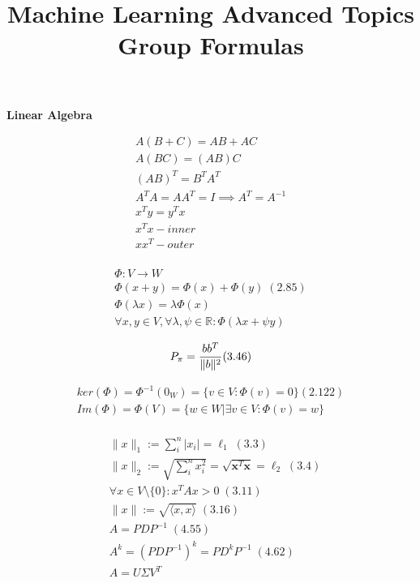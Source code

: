 \documentclass[fleqn,9pt]{article}
\date{} %
\title{Machine Learning Advanced Topics Group Formulas \vspace{-6em}}
\begin{document}
\maketitle



\begin{minipage}[t]{0.33\textwidth}

\textbf{Linear Algebra}

\begin{equation*}
\begin{split}
	A(B+C) = AB + AC\\
	A(BC) = (AB)C \\
	(AB)^T =B^TA^T\\
	A^TA = AA^T = I \implies A^T = A^{-1}\\
	x^Ty = y^Tx\\
		x^Tx - inner\\
	xx^T - outer\\
\end{split}	
\end{equation*}

\begin{multline*}
\Phi: V \to W \\
\Phi(x+y) = \Phi(x) + \Phi(y)\; (2.85) \\
	\Phi(\lambda x) =  \lambda \Phi(x)\\
\forall x,y\in V, \forall \lambda, \psi \in \mathbb{R} : \Phi(\lambda x + \psi y) 
\end{multline*}

\begin{equation*}
P_\pi=\frac{bb^T}{\|b\|^2} (3.46) \\
\end{equation*}

\begin{multline*}
ker(\Phi) = \Phi^{-1}(0_W) 
 = \{v\in V: \Phi(v) =0\} (2.122)\\
Im(\Phi) = \Phi(V) 
 =  \{w \in W | \exists v\in V: \Phi(v) = w \}\\
\end{multline*}

\begin{equation*}
\begin{split}
&\|x\|_1 := \sum_i^n |x_i| =\ell_1 \;(3.3)\\
&\|x\|_2 := \sqrt{\sum_i^n x_i^2} = \sqrt{\textbf{x}^T \textbf{x}} =\ell_2 \;(3.4)\\
&\forall x \in V\setminus\{0\}: x^TAx > 0\;(3.11)\\
&\|x\| := \sqrt{\langle x,x\rangle}\;(3.16)\\
&A = P D P^{-1}\;(4.55)\\
&A^k =(P D P^{-1})^k = P D^k P^{-1}\;(4.62)\\
&A = U\Sigma V^T\\
\end{split}	
\end{equation*}


\end{minipage}
\end{document}
